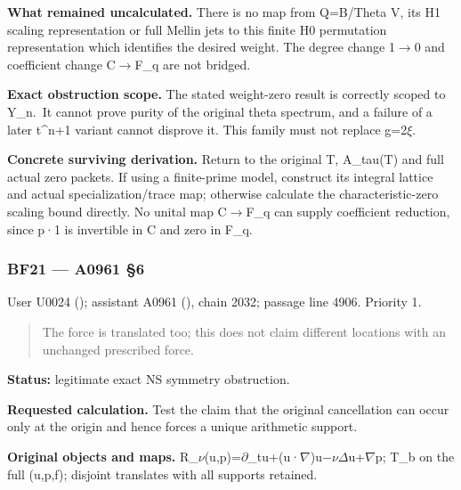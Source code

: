 \textbf{What remained uncalculated.} There is no map from Q=B/Theta V,
its H1 scaling representation or full Mellin jets to this finite H0
permutation representation which identifies the desired weight. The
degree change 1\allowbreak{}\ensuremath{→}\allowbreak{}0 and coefficient
change C\allowbreak{}\ensuremath{→}\allowbreak{}F\_q are not bridged.

\textbf{Exact obstruction scope.} The stated weight-zero result is
correctly scoped to Y\_n.~It cannot prove purity of the original theta
spectrum, and a failure of a later t\^{}n+1 variant cannot disprove it.
This family must not replace
g=2\allowbreak{}\ensuremath{ξ}\allowbreak{}.

\textbf{Concrete surviving derivation.} Return to the original T,
A\_tau(T) and full actual zero packets. If using a finite-prime model,
construct its integral lattice and actual specialization/trace map;
otherwise calculate the characteristic-zero scaling bound directly. No
unital map C\allowbreak{}\ensuremath{→}\allowbreak{}F\_q can supply
coefficient reduction, since p·1 is invertible in C and zero in F\_q.

\subsubsection{BF21 --- A0961 §6}\label{TranscriptLedgerStage:bf21-a0961-6}

User U0024 (\protect{});
assistant A0961 (\protect{}),
chain 2032; passage line 4906. Priority 1.

\begin{quote}
The force is translated too; this does not claim different locations
with an unchanged prescribed force.
\end{quote}

\textbf{Status:} legitimate exact NS symmetry obstruction.

\textbf{Requested calculation.} Test the claim that the original
cancellation can occur only at the origin and hence forces a unique
arithmetic support.

\textbf{Original objects and maps.}
R\_\allowbreak{}\ensuremath{ν}\allowbreak{}(u,p)=\allowbreak{}\ensuremath{∂}\allowbreak{}\_tu+(u·\allowbreak{}\ensuremath{∇}\allowbreak{})u\allowbreak{}\ensuremath{−}\allowbreak{}\allowbreak{}\ensuremath{ν}\allowbreak{}\allowbreak{}\ensuremath{Δ}\allowbreak{}u+\allowbreak{}\ensuremath{∇}\allowbreak{}p;
T\_b on the full (u,p,f); disjoint translates with all supports
retained.

